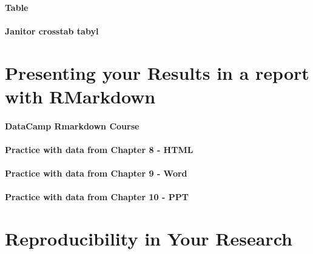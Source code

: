 \documentclass[]{book}
\theoremstyle{definition}
\theoremstyle{definition}
\theoremstyle{definition}
\theoremstyle{remark}
\begin{document}
\hypertarget{table}{%
\subsubsection{Table}\label{table}}

\hypertarget{janitor-crosstab-tabyl}{%
\subsubsection{Janitor crosstab tabyl}\label{janitor-crosstab-tabyl}}

\hypertarget{presenting-your-results-in-a-report-with-rmarkdown}{%
\chapter{Presenting your Results in a report with
RMarkdown}\label{presenting-your-results-in-a-report-with-rmarkdown}}

\hypertarget{datacamp-rmarkdown-course}{%
\subsubsection{DataCamp Rmarkdown
Course}\label{datacamp-rmarkdown-course}}

\hypertarget{practice-with-data-from-chapter-8---html}{%
\subsubsection{Practice with data from Chapter 8 -
HTML}\label{practice-with-data-from-chapter-8---html}}

\hypertarget{practice-with-data-from-chapter-9---word}{%
\subsubsection{Practice with data from Chapter 9 -
Word}\label{practice-with-data-from-chapter-9---word}}

\hypertarget{practice-with-data-from-chapter-10---ppt}{%
\subsubsection{Practice with data from Chapter 10 -
PPT}\label{practice-with-data-from-chapter-10---ppt}}

\hypertarget{reproducibility-in-your-research}{%
\chapter{Reproducibility in Your
Research}\label{reproducibility-in-your-research}}
\end{document}
